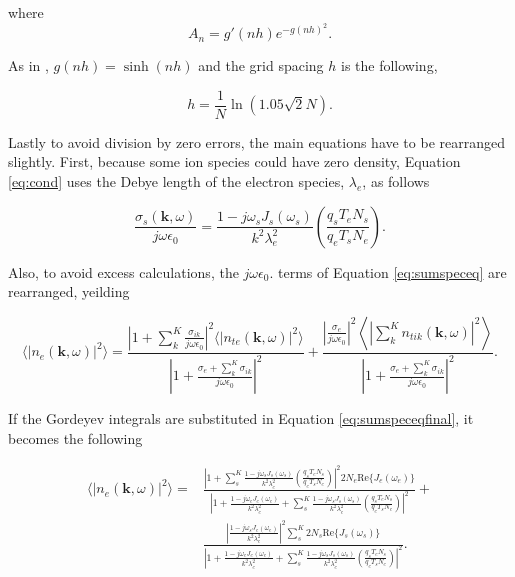 \noindent where
\begin{equation}
\label{eq:anterm}
A_n = g'(nh)e^{-g(nh)^2}.
\end{equation}

\noindent As in \citep{Ooi:2007jx}, $g(nh) = \sinh (nh)$ and the grid spacing $h$ is the following,

\begin{equation}
\label{eq:hterm}
h = \frac{1}{N}\ln(1.05\sqrt{2}N).
\end{equation} 


Lastly to avoid division by zero errors, the main equations have to be rearranged slightly. First, because some ion species could have zero density, Equation \ref{eq:cond} uses the Debye length of the electron species, $\lambda_e$, as follows

\begin{equation}
\label{eq:condnew}
\frac{\sigma_{s}(\mathbf{k},\omega)}{j\omega\epsilon_0} = \frac{1-j\omega_s J_s(\omega_s)}{k^2\lambda_e^2} \left(\frac{q_sT_eN_s}{q_eT_sN_e}\right).
\end{equation}

Also, to avoid excess calculations, the $j\omega\epsilon_0$. terms of Equation \ref{eq:sumspeceq} are rearranged, yeilding

\begin{equation}
\label{eq:sumspeceqfinal}
\displaystyle \langle \left|n_e(\mathbf{k},\omega)\right|^2\rangle =  \frac{\left|1 +  \sum_k^K\frac{\sigma_{ik}}{j\omega\epsilon_0} \right|^2 \langle |n_{te}(\mathbf{k},\omega)|^2\rangle}{\left|1 +\frac{\sigma_e+ \sum_k^K\sigma_{ik}}{j\omega\epsilon_0} \right|^2} + \frac{\left| \frac{\sigma_e}{j\omega\epsilon_0} \right|^2\left \langle \left|\sum_k^Kn_{tik}(\mathbf{k},\omega)\right|^2\right\rangle}{\left|1 +\frac{\sigma_e+ \sum_k^K\sigma_{ik}}{j\omega\epsilon_0} \right|^2}.
\end{equation}

\noindent If the Gordeyev integrals are substituted in Equation \ref{eq:sumspeceqfinal}, it becomes the following

\begin{equation}
\label{eq:sumspeceqactual}
\begin{split}
\displaystyle \langle \left|n_e(\mathbf{k},\omega)\right|^2\rangle =&  \frac{\left|1 + \sum_s^K  \frac{1-j\omega_s J_s(\omega_s)}{k^2\lambda_e^2} \left(\frac{q_sT_eN_s}{q_eT_sN_e}\right) \right|^2 2N_e\text{Re}\{J_e(\omega_e)\}}{\left|1 + \frac{1-j\omega_e J_e(\omega_e)}{k^2\lambda_e^2}  +\sum_s^K  \frac{1-j\omega_s J_s(\omega_s)}{k^2\lambda_e^2} \left(\frac{q_sT_eN_s}{q_eT_sN_e}\right) \right|^2}       + \\        & \frac{\left| \frac{1-j\omega_s J_e(\omega_e)}{k^2\lambda_e^2} \right|^2\sum_s^K  2N_s\text{Re}\{J_s(\omega_s)\}}{\left|1 + \frac{1-j\omega_e J_e(\omega_e)}{k^2\lambda_e^2}  +\sum_s^K  \frac{1-j\omega_s J_s(\omega_s)}{k^2\lambda_e^2} \left(\frac{q_sT_eN_s}{q_eT_sN_e}\right) \right|^2}.
\end{split}
\end{equation}

